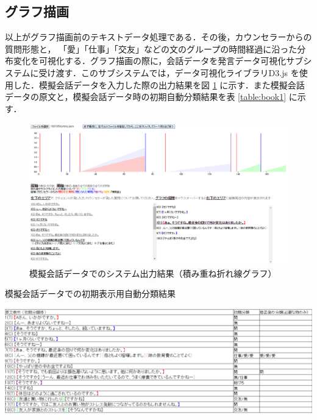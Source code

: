 \documentclass[shuuron]{kuee}
\begin{document}
\subsection{グラフ描画}
以上がグラフ描画前のテキストデータ処理である．その後，カウンセラーからの質問形態と， 「愛」「仕事」「交友」などの文のグループの時間経過に沿った分布変化を可視化する．グラフ描画の際に，会話データを発言データ可視化サブシステムに受け渡す．このサブシステムでは，データ可視化ライブラリD3.js
\cite{bostock2012d3}
を使用した．模擬会話データを入力した際の出力結果を図
\ref{fig:6_1}
に示す．また模擬会話データの原文と，模擬会話データ時の初期自動分類結果を表
\ref{table:book1}
に示す．
\begin{figure}
  \begin{center}
    \includegraphics[width=\linewidth]{6_1.png}
  \end{center}
  \caption{模擬会話データでのシステム出力結果（積み重ね折れ線グラフ）}
  \label{fig:6_1}
\end{figure}

\begin{table}
  \caption{模擬会話データでの初期表示用自動分類結果}
  \label{table:book1}
  \begin{center}
    \includegraphics[width=\linewidth]{book1.png}
  \end{center}
\end{table}
\end{document}
